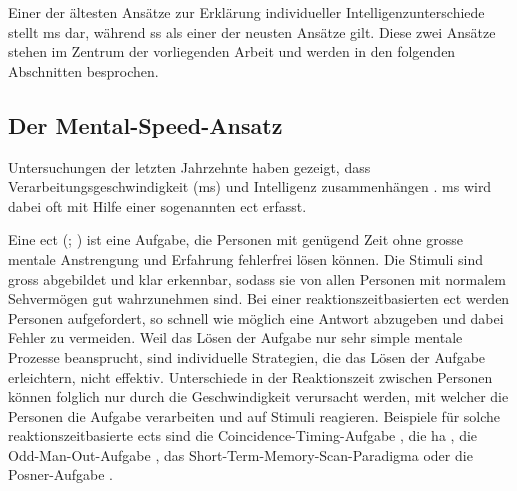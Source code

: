\documentclass[11pt, twoside, a4paper]{book}		%
\begin{document}
Einer der ältesten Ansätze zur Erklärung individueller Intelligenzunterschiede stellt \gls{ms} dar, während \gls{ss} als einer der neusten Ansätze gilt. Diese zwei Ansätze stehen im Zentrum der vorliegenden Arbeit und werden in den folgenden Abschnitten besprochen.


\subsection{Der Mental-Speed-Ansatz \label{subsec:Der_Mental-Speed-Ansatz}}

Untersuchungen der letzten Jahrzehnte  haben gezeigt, dass Verarbeitungsgeschwindigkeit (\gls{ms}) und Intelligenz zusammenhängen \citep[für Übersichtsarbeiten siehe][]{Deary2000a, Jensen2006, Sheppard2008}. \gls{ms} wird dabei oft mit Hilfe einer sogenannten \gls{ect} erfasst.

Eine \gls{ect} (\citealp[S. 11]{Carroll1993}; \citealp[S. 203--209]{Jensen1998a}) ist eine Aufgabe, die Personen mit genügend Zeit ohne grosse mentale Anstrengung und Erfahrung fehlerfrei lösen können. Die Stimuli sind gross abgebildet und klar erkennbar, sodass sie von allen Personen mit normalem Sehvermögen gut wahrzunehmen sind. Bei einer reaktionszeitbasierten \gls{ect} werden Personen aufgefordert, so schnell wie möglich eine Antwort abzugeben und dabei Fehler zu vermeiden. Weil das Lösen der Aufgabe nur sehr simple mentale Prozesse beansprucht, sind individuelle Strategien, die das Lösen der Aufgabe erleichtern, nicht effektiv. Unterschiede in der Reaktionszeit zwischen Personen können folglich nur durch die Geschwindigkeit verursacht werden, mit welcher die Personen die Aufgabe verarbeiten und auf Stimuli reagieren.
Beispiele für solche reaktionszeitbasierte \glspl{ect} sind
die Coincidence-Timing-Aufgabe \citep[bei welcher ein räumliches Zusammentreffen von zwei Stimuli so rasch als möglich erkannt werden muss;][]{Smith1987a}, 
die \gls{ha} \citep[zur Erfassung einfacher Reaktionszeit und der Reaktionszeit für eine Mehrfachauswahl;][]{Hick1952}, 
die Odd-Man-Out-Aufgabe \citep[zur Erfassung der Reaktionszeit für eine Mehrfachauswahl;][]{Frearson1986},
das Short-Term-Memory-Scan-Paradigma \citep[zur Erfassung der benötigten Zeit für einen Zugriff auf das Kurzzeitgedächtnis;][]{Sternberg1966, Sternberg1969}
oder die Posner-Aufgabe \citep[zur Erfassung der benötigten Zeit für einen Zugriff auf das Langzeitgedächtnis;][]{Posner1969}.
\end{document}

